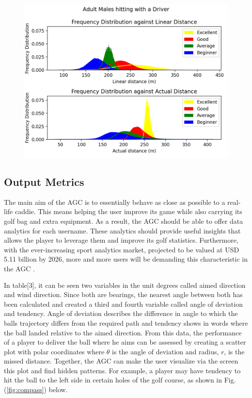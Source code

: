 \documentclass[11pt,landscape]{article}
\begin{document}
\begin{multicols}{3}
\begin{figure}[H]
    \begin{center}
        \includegraphics[]{distribution.png}
        \label{fig:distribution}
    \end{center}
\end{figure}

\subsection{Output Metrics}
The main aim of the AGC is to essentially behave as close as possible to a
real-life caddie. This means helping the user improve its game while also
carrying its golf bag and extra equipment. As a result, the AGC should be able
to offer data analytics for each username. These analytics should provide useful
insights that allows the player to leverage them and improve its golf
statistics. Furthermore, with the ever-increasing sport analytics market,
projected to be valued at USD 5.11 billion by 2026,
more and more users will be demanding this characteristic in the AGC \cite{analytics}. 

In table[3], it can be seen two variables in the unit degrees called aimed
direction and wind direction. Since both are bearings, the nearest angle between
both has been calculated and created a third and fourth variable called angle of
deviation and tendency. Angle of deviation describes the difference in angle to
which the balls trajectory differs from the required path and tendency shows in
words where the ball landed relative to the aimed direction. From this data, the
performance of a player to deliver the ball where he aims can be assessed by
creating a scatter plot with polar coordinates where $\theta$ is the angle of
deviation and radius, $r$, is the missed distance. Together, the AGC can make the
user visualize via the screen this plot and find hidden patterns. For example, a
player may have tendency to hit the ball to the left side in certain holes of
the golf course, as shown in Fig. (\ref{fig:compass}) below. 


\end{multicols}
\end{document}
